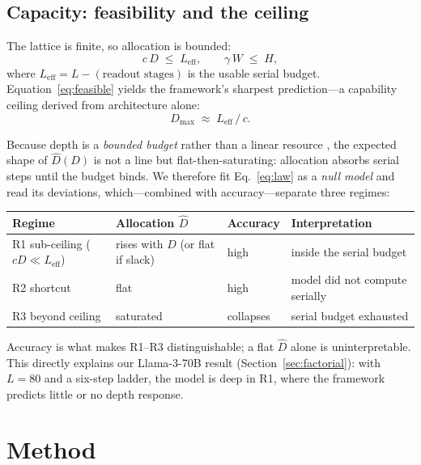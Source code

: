 \documentclass[11pt]{article}
\newcommand{\Dh}{\hat{D}}
\begin{document}
\subsection{Capacity: feasibility and the ceiling}
The lattice is finite, so allocation is bounded:
\begin{equation}
c\,D \;\le\; L_{\text{eff}}, \qquad \gamma\,W \;\le\; H,
\label{eq:feasible}
\end{equation}
where $L_{\text{eff}} = L - (\text{readout stages})$ is the usable serial
budget. Equation~\eqref{eq:feasible} yields the framework's sharpest
prediction---a capability ceiling derived from architecture alone:
\begin{equation}
D_{\max} \;\approx\; L_{\text{eff}}\,/\,c .
\label{eq:dmax}
\end{equation}

Because depth is a \emph{bounded budget} rather than a linear resource
\citep{merrill2023parallelism}, the expected shape of $\Dh(D)$ is not a line
but flat-then-saturating: allocation absorbs serial steps until the budget
binds. We therefore fit Eq.~\eqref{eq:law} as a \emph{null model} and read its
deviations, which---combined with accuracy---separate three regimes:

\begin{center}
\small
\begin{tabular}{llll}
\toprule
Regime & Allocation $\Dh$ & Accuracy & Interpretation \\
\midrule
R1 sub-ceiling ($cD\!\ll\!L_{\text{eff}}$) & rises with $D$ (or flat if slack) & high & inside the serial budget \\
R2 shortcut & flat & high & model did not compute serially \citep{liu2023shortcuts} \\
R3 beyond ceiling & saturated & collapses & serial budget exhausted \\
\bottomrule
\end{tabular}
\end{center}

\noindent Accuracy is what makes R1--R3 distinguishable; a flat $\Dh$ alone is
uninterpretable. This directly explains our Llama-3-70B result
(Section~\ref{sec:factorial}): with $L{=}80$ and a six-step ladder, the model
is deep in R1, where the framework predicts little or no depth response.

\section{Method}\label{sec:method}
\end{document}
